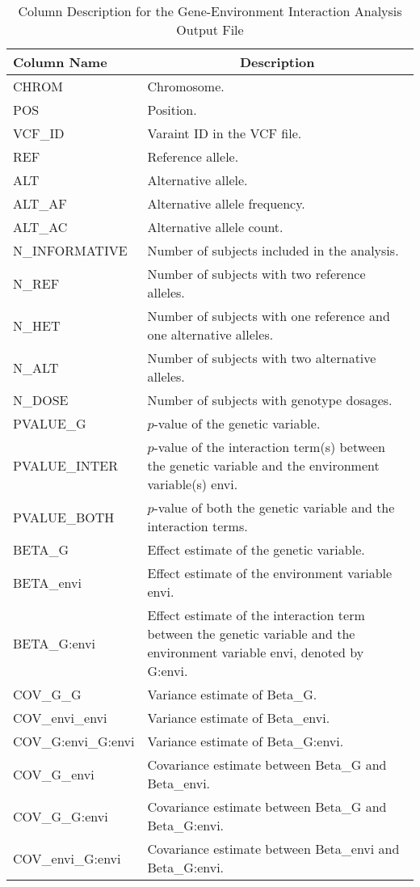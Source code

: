\documentclass[12pt,letter]{article}
\begin{document}
{\centering
\begin{longtable}{p{4cm}p{11cm}}
\caption{Column Description for the Gene-Environment Interaction Analysis Output File} \\
\hline\hline
\multicolumn{1}{l}{Column Name} & \multicolumn{1}{c}{Description} \\
\hline
{CHROM} & Chromosome. \\
{POS} & Position. \\
{VCF\_ID} & Varaint ID in the VCF file. \\
{REF} & Reference allele.\\
{ALT} & Alternative allele.\\
{ALT\_AF} & Alternative allele frequency.\\
{ALT\_AC} & Alternative allele count. \\
{N\_INFORMATIVE} & Number of subjects included in the analysis.\\
{N\_REF} & Number of subjects with two reference alleles.\\
{N\_HET} & Number of subjects with one reference and one alternative alleles.\\
{N\_ALT} & Number of subjects with two alternative alleles. \\
{N\_DOSE} & Number of subjects with genotype dosages. \\
{PVALUE\_G} & $p$-value of the genetic variable.\\
{PVALUE\_INTER} & $p$-value of the interaction term(s) between the genetic variable and the environment variable(s) {\ttfamily envi}.\\
{PVALUE\_BOTH} & $p$-value of both the genetic variable and the interaction terms.\\
{BETA\_G} & Effect estimate of the genetic variable. \\
{BETA\_}{\ttfamily envi} & Effect estimate of the environment variable {\ttfamily envi}. \\
{BETA\_G:}{\ttfamily envi} & Effect estimate of the interaction term between the genetic variable and the environment variable {\ttfamily envi},
denoted by G:{\ttfamily envi}. \\
{COV\_G\_G} & Variance estimate of {Beta\_G}. \\
{COV\_}{\ttfamily envi}\_{\ttfamily envi} & Variance estimate of {Beta\_}{\ttfamily envi}. \\
{COV\_G:}{\ttfamily envi}\_G:{\ttfamily envi} & Variance estimate of {Beta\_G:}{\ttfamily envi}. \\
{COV\_G\_}{\ttfamily envi} & Covariance estimate between {Beta\_G} and {Beta\_}{\ttfamily envi}. \\
{COV\_G\_G:}{\ttfamily envi} & Covariance estimate between {Beta\_G} and {Beta\_G:}{\ttfamily envi}. \\
{COV\_}{\ttfamily envi}{\_G:}{\ttfamily envi} & Covariance estimate between {Beta\_}{\ttfamily envi} and {Beta\_G:}{\ttfamily envi}. \\
\hline
\end{longtable}}
\end{document}
